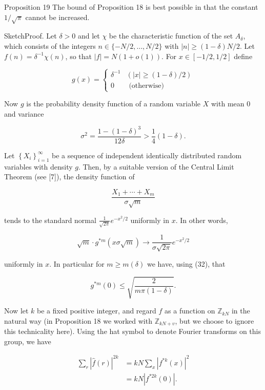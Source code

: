\documentclass[10pt]{article}
\begin{document}
Proposition 19 The bound of Proposition 18 is best possible in that the constant $1 / \sqrt{\pi}$ cannot be increased.

SketchProof. Let $\delta>0$ and let $\chi$ be the characteristic function of the set $A_{\delta}$, which consists of the integers $n \in\{-N / 2, \ldots, N / 2\}$ with $|n| \geq(1-\delta) N / 2$. Let $f(n)=\delta^{-1} \chi(n)$, so that $|f|=N(1+o(1))$. For $x \in[-1 / 2,1 / 2]$ define

$$
g(x)= \begin{cases}\delta^{-1} & (|x| \geq(1-\delta) / 2) \\ 0 & \text { (otherwise) }\end{cases}
$$

Now $g$ is the probability density function of a random variable $X$ with mean 0 and variance


\begin{equation*}
\sigma^{2}=\frac{1-(1-\delta)^{3}}{12 \delta}>\frac{1}{4}(1-\delta) . \tag{32}
\end{equation*}


Let $\left\{X_{i}\right\}_{i=1}^{\infty}$ be a sequence of independent identically distributed random variables with density $g$. Then, by a suitable version of the Central Limit Theorem (see [7]), the density function of

$$
\frac{X_{1}+\cdots+X_{m}}{\sigma \sqrt{m}}
$$

tends to the standard normal $\frac{1}{\sqrt{2 \pi}} e^{-x^{2} / 2}$ uniformly in $x$. In other words,

$$
\sqrt{m} \cdot g^{* m}(x \sigma \sqrt{m}) \longrightarrow \frac{1}{\sigma \sqrt{2 \pi}} e^{-x^{2} / 2}
$$

uniformly in $x$. In particular for $m \geq m(\delta)$ we have, using (32), that


\begin{equation*}
g^{* m}(0) \leq \sqrt{\frac{2}{m \pi(1-\delta)}} . \tag{33}
\end{equation*}


Now let $k$ be a fixed positive integer, and regard $f$ as a function on $\mathbb{Z}_{k N}$ in the natural way (in Proposition 18 we worked with $\mathbb{Z}_{k N+v}$, but we choose to ignore this technicality here). Using the hat symbol to denote Fourier transforms on this group, we have


\begin{align*}
\sum_{r}|\hat{f}(r)|^{2 k} & =k N \sum_{x}\left|f^{* k}(x)\right|^{2} \\
& =k N\left|f^{* 2 k}(0)\right| . \tag{34}
\end{align*}
\end{document}

